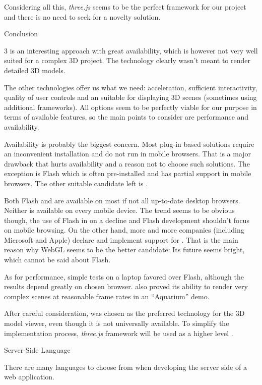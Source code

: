 Considering all this, {\it three.js} seems to be the perfect framework for our project and there is no need to seek for a novelty solution.

\secc Conclusion

3 is an interesting approach with great availability, which is however not very well suited for a complex 3D project. The technology clearly wasn’t meant to render detailed 3D models.

The other technologies offer us what we need:  acceleration, sufficient interactivity, quality of user controls and an  suitable for displaying 3D scenes (sometimes using additional frameworks). All options seem to be perfectly viable for our purpose in terms of available features, so the main points to consider are performance and availability.

Availability is probably the biggest concern. Most plug-in based solutions require an inconvenient installation and do not run in mobile browsers. That is a major drawback that hurts availability and a reason not to choose such solutions. The exception is Flash which is often pre-installed and has partial support in mobile browsers. The other suitable candidate left is .

Both Flash and  are available on most if not all up-to-date desktop browsers. Neither is available on every mobile device. The trend seems to be obvious though, the use of Flash in on a decline and Flash development shouldn’t focus on mobile browsing. On the other hand, more and more companies (including Microsoft and Apple) declare and implement support for . That is the main reason why WebGL seems to be the better candidate: Its future seems bright, which cannot be said about Flash.

As for performance, simple tests on a laptop favored  over Flash, although the results depend greatly on chosen browser.  also proved its ability to render very complex scenes at reasonable frame rates in an “Aquarium” demo.

After careful consideration,  was chosen as the preferred technology for the 3D model viewer, even though it is not universally available. To simplify the implementation process, {\it three.js} framework will be used as a higher level .

\sec Server-Side Language

There are many languages to choose from when developing the server side of a web application.

